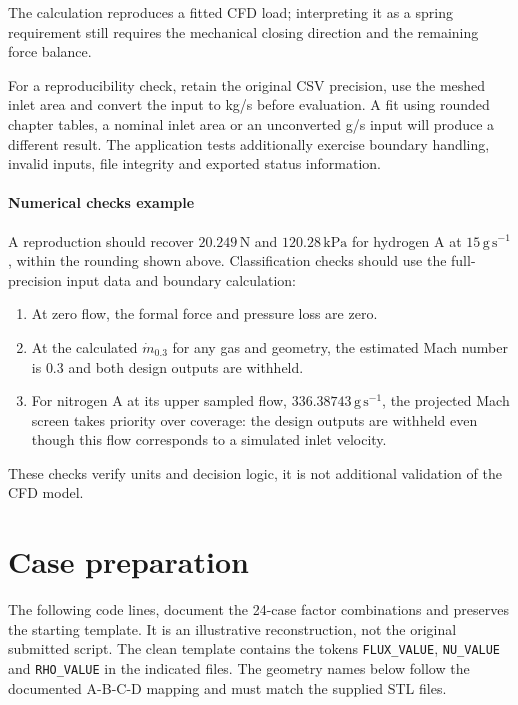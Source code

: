 
The calculation reproduces a fitted CFD load; interpreting it as a spring requirement still requires the mechanical closing direction and the remaining force balance.

For a reproducibility check, retain the original CSV precision, use the meshed inlet area and convert the input to kg/s before evaluation. A fit using rounded chapter tables, a nominal inlet area or an unconverted g/s input will produce a different result. The application tests additionally exercise boundary handling, invalid inputs, file integrity and exported status information.


\paragraph{Numerical checks example}
A reproduction should recover $20.249\,\mathrm{N}$ and $120.28\,\mathrm{kPa}$ for hydrogen A at $15\,\mathrm{g\,s^{-1}}$, within the rounding shown above. Classification checks should use the full-precision input data and boundary calculation:
\begin{enumerate}
\item At zero flow, the formal force and pressure loss are zero.
\item At the calculated $\dot m_{0.3}$ for any gas and geometry, the estimated Mach number is $0.3$ and both design outputs are withheld.
\item For nitrogen A at its upper sampled flow, $336.38743\,\mathrm{g\,s^{-1}}$, the projected Mach screen takes priority over coverage: the design outputs are withheld even though this flow corresponds to a simulated inlet velocity.
\end{enumerate}
These checks verify units and decision logic, it is not additional validation of the CFD model.
\clearpage
\section{Case preparation}
\label{sec:app_doe_gen}

The following code lines, document the 24-case factor combinations and preserves the starting template. It is an illustrative reconstruction, not the original submitted script. The clean template contains the tokens \texttt{FLUX\_VALUE}, \texttt{NU\_VALUE} and \texttt{RHO\_VALUE} in the indicated files. The geometry names below follow the documented A-B-C-D mapping and must match the supplied STL files.

